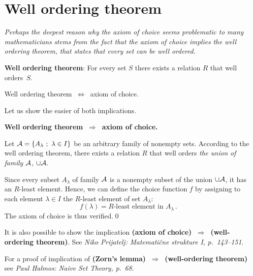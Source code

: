 \documentclass[11pt,paper=b5,footinclude,headinclude]{scrbook} %
\def\sledi {{~\Rightarrow~}}
\def\cee {{~\Leftrightarrow~}}
\theoremstyle{remark}
\theoremstyle{definition} %
\theoremstyle{theorem} %
\begin{document}
\section{Well ordering theorem}

\emph{ Perhaps the deepest reason why the axiom of choice seems problematic to many mathematicians stems from the fact that
the axiom of choice implies the well ordering theorem, that states that every set can be well ordered.}


\medskip
\textbf{ Well ordering theorem}:
For every set $S$ there exists a relation $R$ that well orders~$S$.

\bigskip
Well ordering theorem $\cee$ axiom of choice.

\bigskip
Let us show the easier of both implications.

\textbf{ Well ordering theorem $\sledi$ axiom of choice.}

Let ${\cal A} = \{A_\lambda~;~\lambda\in I\}$ be an arbitrary family of nonempty sets.
According to the well ordering theorem, there exists a relation  $R$ that well orders \emph{ the union of family ${\cal A}$}, $\cup {\cal A}$.

Since every subset $A_\lambda$ of family ${\cal A}$ is a nonempty subset of the union
$\cup{\cal A}$, it has an $R$-least element.
Hence, we can define the choice function $f$ by assigning to each element $\lambda\in I$ the
$R$-least element of set  $A_\lambda$:
$$f(\lambda) = R\textrm{-least element in  }A_\lambda\,.$$
The axiom of choice is thus verified.\qed

It is also possible to show the implication \textbf{ (axiom of choice) $\sledi$ (well-ordering theorem)}.
See \emph{ Niko Prijatelj: Matemati\v cne strukture I, p.~143--151}.

For a proof of implication of \textbf{ (Zorn's lemma) $\sledi$ (well-ordering theorem)}
see \emph{ Paul Halmos: Naive Set Theory, p.~68}.
\end{document}
